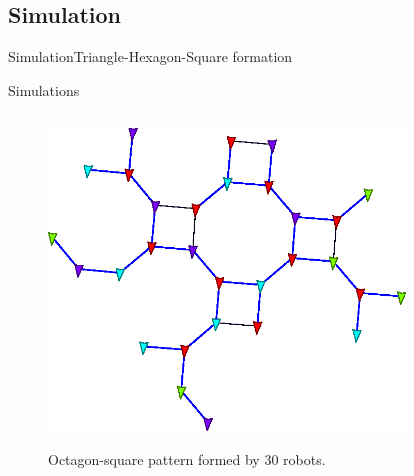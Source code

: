 \subsection{Simulation}
\begin{frame}{Simulation}{Triangle-Hexagon-Square formation}
  \begin{center}
  \end{center}
\end{frame}
\begin{frame}{Simulations}
  \begin{columns}
    \begin{column}{.45\textwidth}
        \begin{figure}
          \href{run:shell.command}{\includegraphics[width=\linewidth]{figs/octsq}}
          \caption{Octagon-square pattern formed by 30 robots.}
        \end{figure}
    \end{column}
    \begin{column}{.45\textwidth}
        \begin{figure}

\end{figure}
\end{column}
\end{columns}
\end{frame}

